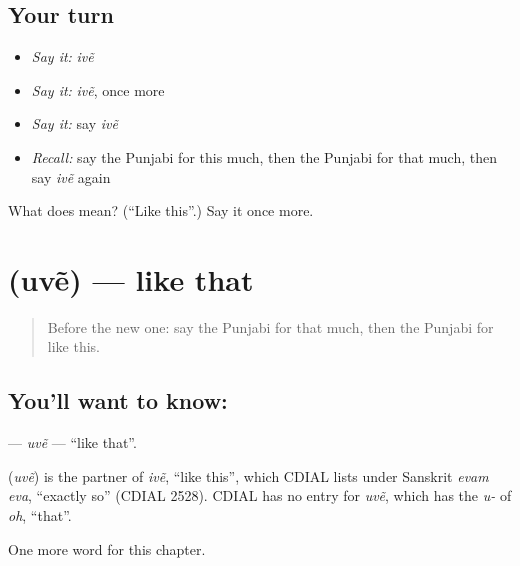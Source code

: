 \subsection*{Your turn}
\begin{itemize}
\raggedright
  \item \emph{Say it:} \emph{ivẽ}
  \item \emph{Say it:} \emph{ivẽ}, once more
  \item \emph{Say it:} say \emph{ivẽ}
  \item \emph{Recall:} say the Punjabi for this much, then the Punjabi for that much, then say \emph{ivẽ} again
\end{itemize}

\begin{tcolorbox}[breakable,colback=teal!4,colframe=teal!35!black,title={Before you move on}]
What does  mean? (\textquotedblleft{}Like this\textquotedblright{}.) Say it once more.
\end{tcolorbox}
\section[\texorpdfstring{\pa{ਉਵੇਂ} (uvẽ)}{ਉਵੇਂ (uvẽ)}]{ (uvẽ) — like that}

\label{lesson:PA-C108-uve}



\begin{quote}
Before the new one: say the Punjabi for that much, then the Punjabi for like this.
\end{quote}

\subsection*{You'll want to know: }
\textbf{} — \emph{uvẽ} — \textquotedblleft{}like that\textquotedblright{}.

\begin{cousinweb}
\textbf{} (\emph{uvẽ}) is the partner of \emph{ivẽ}, \textquotedblleft{}like this\textquotedblright{}, which CDIAL lists under Sanskrit \emph{evam eva}, \textquotedblleft{}exactly so\textquotedblright{} (CDIAL 2528). CDIAL has no entry for \emph{uvẽ}, which has the \emph{u-} of \emph{oh}, \textquotedblleft{}that\textquotedblright{}.
\end{cousinweb}

\begin{grammarlens}[title={What you've built}]
One more word for this chapter.
\end{grammarlens}

